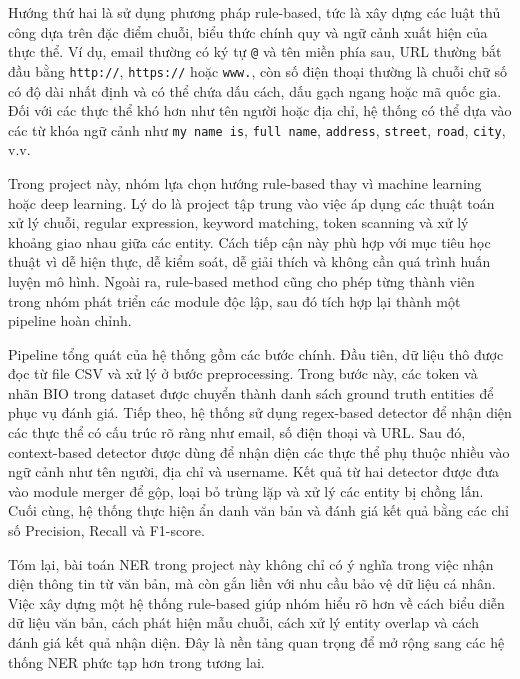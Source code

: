 Hướng thứ hai là sử dụng phương pháp rule-based, tức là xây dựng các luật thủ công dựa trên đặc điểm chuỗi, biểu thức chính quy và ngữ cảnh xuất hiện của thực thể. Ví dụ, email thường có ký tự \texttt{@} và tên miền phía sau, URL thường bắt đầu bằng \texttt{http://}, \texttt{https://} hoặc \texttt{www.}, còn số điện thoại thường là chuỗi chữ số có độ dài nhất định và có thể chứa dấu cách, dấu gạch ngang hoặc mã quốc gia. Đối với các thực thể khó hơn như tên người hoặc địa chỉ, hệ thống có thể dựa vào các từ khóa ngữ cảnh như \texttt{my name is}, \texttt{full name}, \texttt{address}, \texttt{street}, \texttt{road}, \texttt{city}, v.v.

Trong project này, nhóm lựa chọn hướng rule-based thay vì machine learning hoặc deep learning. Lý do là project tập trung vào việc áp dụng các thuật toán xử lý chuỗi, regular expression, keyword matching, token scanning và xử lý khoảng giao nhau giữa các entity. Cách tiếp cận này phù hợp với mục tiêu học thuật vì dễ hiện thực, dễ kiểm soát, dễ giải thích và không cần quá trình huấn luyện mô hình. Ngoài ra, rule-based method cũng cho phép từng thành viên trong nhóm phát triển các module độc lập, sau đó tích hợp lại thành một pipeline hoàn chỉnh.

Pipeline tổng quát của hệ thống gồm các bước chính. Đầu tiên, dữ liệu thô được đọc từ file CSV và xử lý ở bước preprocessing. Trong bước này, các token và nhãn BIO trong dataset được chuyển thành danh sách ground truth entities để phục vụ đánh giá. Tiếp theo, hệ thống sử dụng regex-based detector để nhận diện các thực thể có cấu trúc rõ ràng như email, số điện thoại và URL. Sau đó, context-based detector được dùng để nhận diện các thực thể phụ thuộc nhiều vào ngữ cảnh như tên người, địa chỉ và username. Kết quả từ hai detector được đưa vào module merger để gộp, loại bỏ trùng lặp và xử lý các entity bị chồng lấn. Cuối cùng, hệ thống thực hiện ẩn danh văn bản và đánh giá kết quả bằng các chỉ số Precision, Recall và F1-score.

Tóm lại, bài toán NER trong project này không chỉ có ý nghĩa trong việc nhận diện thông tin từ văn bản, mà còn gắn liền với nhu cầu bảo vệ dữ liệu cá nhân. Việc xây dựng một hệ thống rule-based giúp nhóm hiểu rõ hơn về cách biểu diễn dữ liệu văn bản, cách phát hiện mẫu chuỗi, cách xử lý entity overlap và cách đánh giá kết quả nhận diện. Đây là nền tảng quan trọng để mở rộng sang các hệ thống NER phức tạp hơn trong tương lai.
